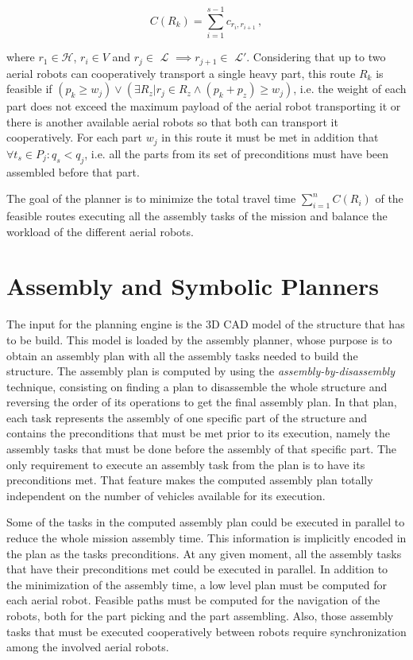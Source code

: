 \documentclass[runningheads,a4paper]{llncs}
\begin{document}
 \begin{equation}
 	{C(R_{k}) = \sum_{i=1}^{s-1} c_{r_i,r_{i+1}}} \, ,
 	\label{eq:route_cost}
 \end{equation}	

\noindent where ${r_1 \in \mathcal{H}}$, ${r_i \in V}$ and ${r_j \in}$ $\mathcal{L}$ ${\implies r_{j+1} \in}$ $\mathcal{L'}$. Considering that up to two aerial robots can cooperatively transport a single heavy part, this route ${R_{k}}$ is feasible if ${(p_k \geq w_j) \lor (\exists R_{z} | r_j \in R_{z} \land (p_k+p_z) \geq w_j)}$, i.e. the weight of each part does not exceed the maximum payload of the aerial robot transporting it or there is another available aerial robots so that both can transport it cooperatively. For each part $w_j$ in this route it must be met in addition that $\forall t_{s} \in P_{j}: q_{s}<q_{j}$, i.e. all the parts from its set of preconditions must have been assembled before that part.
	
The goal of the planner is to minimize the total travel time $\sum_{i=1}^{n} C(R_{i})$ of the feasible routes executing all the assembly tasks of the mission and balance the workload of the different aerial robots.

\section{Assembly and Symbolic Planners}
	\label{sec:assembly_symbolic}

The input for the planning engine is the 3D CAD model of the structure that has to be build. This model is loaded by the assembly planner, whose purpose is to obtain an assembly plan with all the assembly tasks needed to build the structure. The assembly plan is computed by using the \emph{assembly-by-disassembly} technique, consisting on finding a plan to disassemble the whole structure and reversing the order of its operations to get the final assembly plan. In that plan, each task represents the assembly of one specific part of the structure and contains the preconditions that must be met prior to its execution, namely the assembly tasks that must be done before the assembly of that specific part. The only requirement to execute an assembly task from the plan is to have its preconditions met. That feature makes the computed assembly plan totally independent on the number of vehicles available for its execution.

Some of the tasks in the computed assembly plan could be executed in parallel to reduce the whole mission assembly time. This information is implicitly encoded in the plan as the tasks preconditions. At any given moment, all the assembly tasks that have their preconditions met could be executed in parallel. In addition to the minimization of the assembly time, a low level plan must be computed for each aerial robot. Feasible paths must be computed for the navigation of the robots, both for the part picking and the part assembling. Also, those assembly tasks that must be executed cooperatively between robots require synchronization among the involved aerial robots. 
\end{document}
